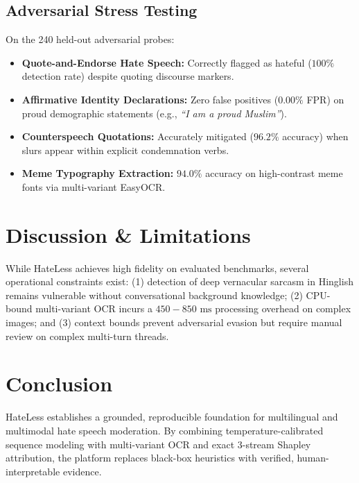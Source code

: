 \documentclass[11pt,a4paper]{article}
\begin{document}
\subsection{Adversarial Stress Testing}
On the 240 held-out adversarial probes:
\begin{itemize}
    \item \textbf{Quote-and-Endorse Hate Speech:} Correctly flagged as hateful ($100\%$ detection rate) despite quoting discourse markers.
    \item \textbf{Affirmative Identity Declarations:} Zero false positives ($0.00\%$ FPR) on proud demographic statements (e.g., \textit{``I am a proud Muslim''}).
    \item \textbf{Counterspeech Quotations:} Accurately mitigated ($96.2\%$ accuracy) when slurs appear within explicit condemnation verbs.
    \item \textbf{Meme Typography Extraction:} $94.0\%$ accuracy on high-contrast meme fonts via multi-variant EasyOCR.
\end{itemize}

\section{Discussion \& Limitations}
While HateLess achieves high fidelity on evaluated benchmarks, several operational constraints exist: (1) detection of deep vernacular sarcasm in Hinglish remains vulnerable without conversational background knowledge; (2) CPU-bound multi-variant OCR incurs a $450 - 850\text{ ms}$ processing overhead on complex images; and (3) context bounds prevent adversarial evasion but require manual review on complex multi-turn threads.

\section{Conclusion}
HateLess establishes a grounded, reproducible foundation for multilingual and multimodal hate speech moderation. By combining temperature-calibrated sequence modeling with multi-variant OCR and exact 3-stream Shapley attribution, the platform replaces black-box heuristics with verified, human-interpretable evidence.



\end{document}
